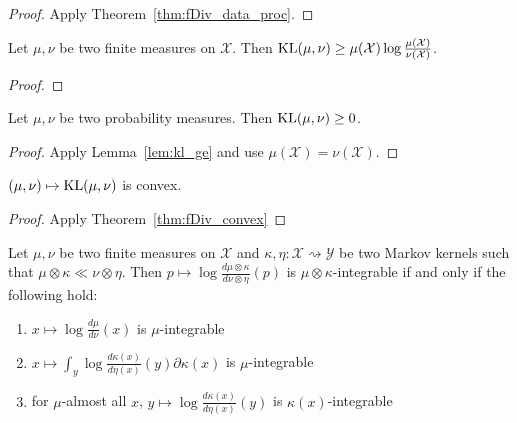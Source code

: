 \begin{proof}
Apply Theorem~\ref{thm:fDiv_data_proc}.
\end{proof}

\begin{lemma}
  \label{lem:kl_ge}
  \leanok
  Let $\mu, \nu$ be two finite measures on $\mathcal X$. Then $\operatorname{KL}(\mu, \nu) \ge \mu(\mathcal X) \log \frac{\mu(\mathcal X)}{\nu(\mathcal X)}$.
\end{lemma}

\begin{proof}\leanok
{}
\end{proof}

\begin{lemma}
  \label{lem:kl_nonneg}
  \leanok
  Let $\mu, \nu$ be two probability measures. Then $\operatorname{KL}(\mu, \nu) \ge 0$.
\end{lemma}

\begin{proof}\leanok
{}
Apply Lemma~\ref{lem:kl_ge} and use $\mu(\mathcal X) = \nu (\mathcal X)$.
\end{proof}

\begin{lemma}
  \label{lem:kl_convex}
  $(\mu, \nu) \mapsto \operatorname{KL}(\mu, \nu)$ is convex.
\end{lemma}

\begin{proof}
Apply Theorem~\ref{thm:fDiv_convex}
\end{proof}

\begin{lemma}
  \label{lem:integrable_llr_compProd_iff}
  \leanok
  \uses{}
  Let $\mu, \nu$ be two finite measures on $\mathcal X$ and $\kappa, \eta : \mathcal X \rightsquigarrow \mathcal Y$ be two Markov kernels such that $\mu \otimes \kappa \ll \nu \otimes \eta$. Then $p \mapsto \log \frac{d \mu \otimes \kappa}{d \nu \otimes \eta}(p)$ is $\mu \otimes \kappa$-integrable if and only if the following hold:
  \begin{enumerate}
    \item $x \mapsto \log \frac{d \mu}{d \nu}(x)$ is $\mu$-integrable \label{:1}
    \item $x \mapsto \int_y  \log \frac{d \kappa(x)}{d \eta(x)}(y) \partial \kappa(x)$ is $\mu$-integrable \label{:2}
    \item for $\mu$-almost all $x$, $y \mapsto \log \frac{d \kappa(x)}{d \eta(x)}(y)$ is $\kappa(x)$-integrable \label{:3}
  \end{enumerate}
\end{lemma}

